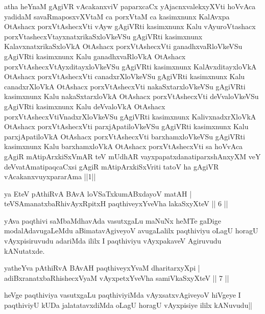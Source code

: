 \begin{shl}
atha heYnaM gAgiVR vAcakanxviV paparxcaCx yAjacnxvalekxyXVti hoVvAca yadidaM savaRmaposxvXVtaM ca porxVtaM ca kasimxnunx KalAvxpa OtAshacx porxVtAshecxVti vAyw gAgiVRti kasimxnunx Kalu vAyuroVtashacx porxVtashecxVtayxnatxrikaSxloVkeVSu gAgiVRti kasimxnunx KalavxnatxrikaSxloVkA OtAshacx porxVtAshecxVti ganadhxvaRloVkeVSu gAgiVRti kasimxnunx Kalu ganadhxvaRloVkA OtAshacx porxVtAshecxVtAyxditayxloVkeVSu gAgiVRti kasimxnunx KalAvxditayxloVkA OtAshacx porxVtAshecxVti canadxrXloVkeVSu gAgiVRti kasimxnunx Kalu canadxrXloVkA OtAshacx porxVtAshecxVti nakaSxtarxloVkeVSu gAgiVRti kasimxnunx Kalu nakaSxtarxloVkA OtAshacx porxVtAshecxVti deVvaloVkeVSu gAgiVRti kasimxnunx Kalu deVvaloVkA OtAshacx porxVtAshecxVtiVnadxrXloVkeVSu gAgiVRti kasimxnunx KalivxnadxrXloVkA OtAshacx porxVtAshecxVti parxjApatiloVkeVSu gAgiVRti kasimxnunx Kalu parxjApatiloVkA OtAshacx porxVtAshecxVti barxhamxloVkeVSu gAgiVRti kasimxnunx Kalu barxhamxloVkA OtAshacx porxVtAshecxVti sa hoVvAca gAgiR mAtipArxkiSxVmAR teV mUdhAR vayxpapatxdanatiparxshAnxyXM veY deVvatAmatipaqcaCxsi gAgiR mAtipArxkiSxVriti tatoV ha gAgiVR vAcakanxvuyxpararAma ||1||
\end{shl}


\begin{shl}
ya EteV pAthiRvA BAvA loVSaTxkumABxdayoV matAH |\\
teVSAmanatxbaRhivAyxRpitxH paqthiveyxYveVha lakaSxyXteV \hfill || 6 ||
\end{shl}

\begin{artha}
yAva paqthivi saMbaMdhavAda vasutxgaLu maNuNx heMTe gaDige modalAdavugaLeMdu aBimatavAgiveyoV avugaLalilx paqthiviyu oLagU horagU vAyxpisiruvudu adariMda ililx I paqthiviyu vAyxpakaveV Agiruvudu kANutatxde. 
\end{artha}

\begin{shl}
yatheYva pAthiRvA BAvAH paqthiveyxYvaM dharitarxyXpi |\\
adiBxranatxbaRhishecxVyaM vAyxpetxYveVha samiVkaSxyXteV \hfill || 7 ||
\end{shl}

\begin{artha}
heVge paqthiviya vasutxgaLu paqthiviyiMda vAyxsatxvAgiveyoV hiVgeye I paqthiviyU kUDa jalatatavxdiMda oLagU horagU vAyxpisiye ililx kANuvudu||
\end{artha}

